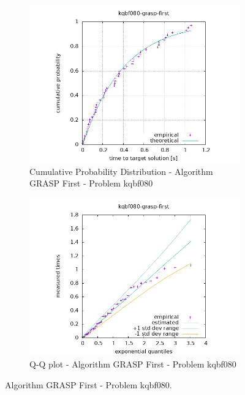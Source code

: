 \begin{figure}[H]
    \centering
    \begin{subfigure}{0.49\textwidth}
        \includegraphics[width=\textwidth]{figure/ttt_plot/kqbf080-grasp-first-exp.jpeg}
        \caption{Cumulative Probability Distribution - Algorithm GRASP First - Problem kqbf080}
        \label{fig:grasp-first-kqbf080-exp}
    \end{subfigure}
    \hfill
    \begin{subfigure}{0.49\textwidth}
        \includegraphics[width=\textwidth]{figure/ttt_plot/kqbf080-grasp-first-qq.jpeg}
        \caption{Q-Q plot - Algorithm GRASP First - Problem kqbf080}
        \label{fig:grasp-first-kqbf080-qq}
    \end{subfigure}
    \caption{Algorithm GRASP First - Problem kqbf080.}
    \label{fig:grasp-first-kqbf080}
\end{figure}


